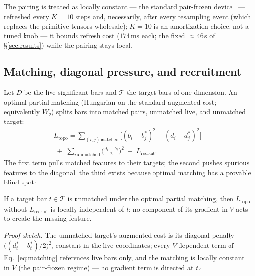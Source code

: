 The pairing is treated as locally constant --- the standard pair-frozen
device~\citep{gabrielsson2020topologylayer,carriere2021optimizing} ---
refreshed every $K{=}10$ steps and, necessarily, after every resampling
event (which replaces the primitive tensors wholesale); $K{=}10$
is an amortization choice, not a tuned knob --- it bounds refresh cost
($174$\,ms each; the fixed ${\approx}46$\,s of \S\ref{sec:results})
while the pairing stays local.

\subsection{Matching, diagonal pressure, and recruitment}
Let $D$ be the live significant bars and $\mathcal{T}$ the target bars of one
dimension. An optimal partial matching (Hungarian on the standard augmented
cost; equivalently $W_2$) splits bars into matched pairs, unmatched live, and
unmatched target:
\begin{equation}\label{eq:matching}
\begin{split}
L_{\mathrm{topo}} = \!\!\sum_{(i,j)\,\mathrm{matched}}\!\!\!
  \big[(b_i-b^*_j)^2+(d_i-d^*_j)^2\big]\\[-2pt]
 \;+\; \sum_{i\,\mathrm{unmatched}} \Big(\tfrac{d_i-b_i}{2}\Big)^{\!2}
 \;+\; L_{\mathrm{recruit}} .
\end{split}
\end{equation}
The first term pulls matched features to their targets; the second
pushes spurious features to the diagonal; the third exists because
optimal matching has a provable blind spot:
\begin{lemma}\label{lem:zerograd}
If a target bar $t\in\mathcal{T}$ is unmatched under the optimal partial
matching, then $L_{\mathrm{topo}}$ without $L_{\mathrm{recruit}}$ is
locally independent of $t$: no component of its gradient in $V$ acts to
create the missing feature.
\end{lemma}
\noindent\emph{Proof sketch.} The unmatched target's augmented cost is its
diagonal penalty $\big((d^*_t-b^*_t)/2\big)^2$, constant in the live
coordinates; every $V$-dependent term of Eq.~\ref{eq:matching} references
live bars only, and the matching is locally constant in $V$ (the
pair-frozen regime) --- no gradient term is directed at $t$.\hfill$\square$

